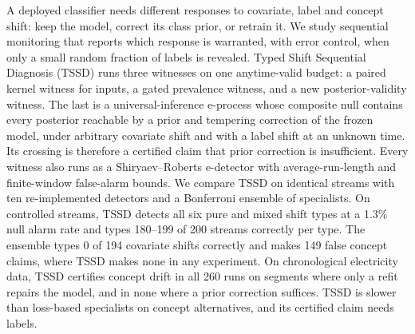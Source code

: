 A deployed classifier needs different responses to covariate, label and concept shift: keep the model, correct its class prior, or retrain it. We study sequential monitoring that reports which response is warranted, with error control, when only a small random fraction of labels is revealed. Typed Shift Sequential Diagnosis (TSSD) runs three witnesses on one anytime-valid budget: a paired kernel witness for inputs, a gated prevalence witness, and a new posterior-validity witness. The last is a universal-inference e-process whose composite null contains every posterior reachable by a prior and tempering correction of the frozen model, under arbitrary covariate shift and with a label shift at an unknown time. Its crossing is therefore a certified claim that prior correction is insufficient. Every witness also runs as a Shiryaev--Roberts e-detector with average-run-length and finite-window false-alarm bounds. We compare TSSD on identical streams with ten re-implemented detectors and a Bonferroni ensemble of specialists. On controlled streams, TSSD detects all six pure and mixed shift types at a 1.3\% null alarm rate and types 180--199 of 200 streams correctly per type. The ensemble types 0 of 194 covariate shifts correctly and makes 149 false concept claims, where TSSD makes none in any experiment. On chronological electricity data, TSSD certifies concept drift in all 260 runs on segments where only a refit repairs the model, and in none where a prior correction suffices. TSSD is slower than loss-based specialists on concept alternatives, and its certified claim needs labels.
